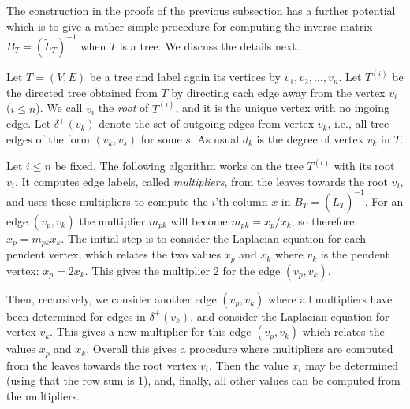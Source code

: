 \documentclass[12pt]{article}
\begin{document}
The construction in the proofs of the previous subsection has a further potential which is to give a rather simple procedure for computing the inverse matrix $B_T=(\tilde{L}_T)^{-1}$ when $T$ is a tree. We discuss the details next. 

Let $T=(V,E)$ be a tree and label again its vertices by $v_1, v_2, \ldots, v_n$. Let $T^{(i)}$ be the directed tree obtained from $T$ by directing each edge away from the vertex $v_i$ ($i \le n$). We call $v_i$ the {\em root}  of $T^{(i)}$, and it is the unique vertex with no ingoing edge.
Let $\delta^+(v_k)$ denote the set of outgoing edges from vertex $v_k$, i.e., all tree edges of the form $(v_k,v_s)$ for some $s$. As usual $d_k$ is the degree of vertex $v_k$ in $T$.

Let $i \le n$ be fixed. The  following algorithm works on the tree $T^{(i)}$ with its root $v_i$. It computes edge labels, called {\em multipliers}, from the leaves towards the root $v_i$, and uses these multipliers to compute the $i$'th column $x$ in $B_T=(\tilde{L}_T)^{-1}$. 
For an edge $(v_p,v_k)$ the multiplier $m_{pk}$ will become 
 $m_{pk}=x_p/x_k$, so therefore  $x_p=m_{pk}x_k$.
The initial step is to consider the Laplacian equation for each pendent vertex, which relates the two values $x_p$ and $x_k$ where $v_k$ is the pendent vertex: $x_p=2x_k$. This gives the multiplier 2 for the edge $(v_p,v_k)$. 

Then, recursively,  we consider another edge $(v_p,v_k)$ where all multipliers have been determined for edges in $\delta^+(v_k)$, and consider the Laplacian equation for vertex $v_k$. This  gives a new multiplier for this edge $(v_p,v_k)$ which relates the values $x_p$ and $x_k$. Overall this gives a procedure where multipliers are computed from the leaves towards the root vertex $v_i$. Then the value $x_i$ may be determined (using that the row sum is 1), and, finally, all other values can be computed from the multipliers.  
\end{document}
